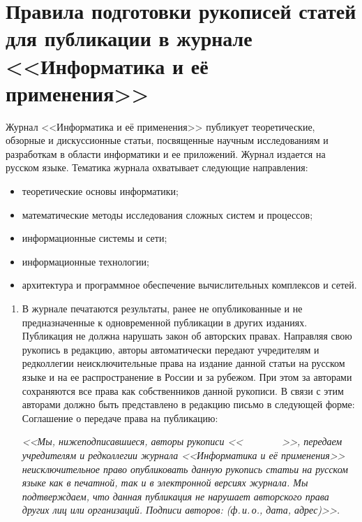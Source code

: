 \vspace*{-60pt} {%
{%
\section*{Правила подготовки рукописей статей для публикации в журнале
<<Информатика и её применения>>}

\thispagestyle{empty}

 Журнал <<Информатика и её применения>> публикует
теоретические, обзорные и дискуссионные статьи, посвященные научным
исследованиям и разработкам в области информатики и ее приложений. Журнал
издается на русском языке. Тематика журнала охватывает следующие направления:
\begin{itemize}
\item теоретические основы информатики;
\item математические методы исследования сложных систем и процессов;
\item информационные системы и сети;
\item информационные технологии;
\item архитектура и программное
обеспечение вычислительных комплексов и сетей.
\end{itemize}
\begin{enumerate}
\item В журнале печатаются результаты, ранее не
опубликованные и не предназначенные к одновременной публикации в других
изданиях. Публикация не должна нарушать закон об авторских правах. Направляя
свою рукопись в редакцию, авторы автоматически передают учредителям и
редколлегии неисключительные права на издание данной статьи на русском языке и
на ее распространение в России и за рубежом. При этом за авторами сохраняются
все права как собственников данной рукописи. В связи с этим авторами должно
быть представлено в редакцию письмо в следующей форме:
Соглашение о передаче права на публикацию:

\textit{<<Мы, нижеподписавшиеся, авторы рукописи <<$\qquad\qquad$>>, передаем
учредителям и редколлегии журнала <<Информатика и её применения>>
неисключительное право опубликовать данную рукопись статьи на русском языке как
в печатной, так и в электронной версиях журнала. Мы подтверждаем, что данная
публикация не нарушает авторского права других лиц или организаций. Подписи
авторов: (ф.\,и.\,о., дата, адрес)>>.}


\end{enumerate}}}
